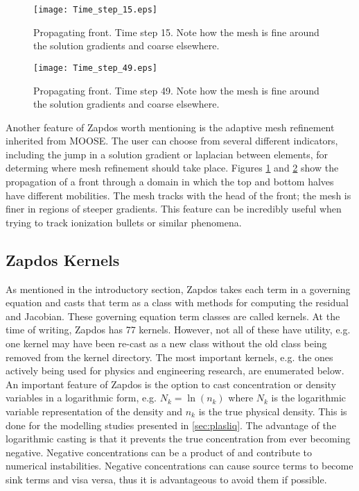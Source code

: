 \begin{figure}[htbp]
  \centering
  \texttt{[image: Time\_step\_15.eps]}
  \caption{Propagating front. Time step 15. Note how the mesh is fine around the solution gradients and coarse elsewhere.}
  \label{fig:step15}
\end{figure}

\begin{figure}[htbp]
  \centering
  \texttt{[image: Time\_step\_49.eps]}
  \caption{Propagating front. Time step 49. Note how the mesh is fine around the solution gradients and coarse elsewhere.}
  \label{fig:step49}
\end{figure}

Another feature of Zapdos worth mentioning is the adaptive mesh refinement inherited from MOOSE. The user can choose from several different indicators, including the jump in a solution gradient or laplacian between elements, for determing where mesh refinement should take place. Figures \ref{fig:step15} and \ref{fig:step49} show the propagation of a front through a domain in which the top and bottom halves have different mobilities. The mesh tracks with the head of the front; the mesh is finer in regions of steeper gradients. This feature can be incredibly useful when trying to track ionization bullets or similar phenomena.

\subsection{Zapdos Kernels}
\label{sec:zap_kernels}

As mentioned in the introductory section, Zapdos takes each term in a governing equation and casts that term as a class with methods for computing the residual and Jacobian. These governing equation term classes are called kernels. At the time of writing, Zapdos has 77 kernels. However, not all of these have utility, e.g. one kernel may have been re-cast as a new class without the old class being removed from the kernel directory. The most important kernels, e.g. the ones actively being used for physics and engineering research, are enumerated below. An important feature of Zapdos is the option to cast concentration or density variables in a logarithmic form, e.g. $N_k = \ln\left(n_k\right)$ where $N_k$ is the logarithmic variable representation of the density and $n_k$ is the true physical density. This is done for the modelling studies presented in \cref{sec:plasliq}. The advantage of the logarithmic casting is that it prevents the true concentration from ever becoming negative. Negative concentrations can be a product of and contribute to numerical instabilities. Negative concentrations can cause source terms to become sink terms and visa versa, thus it is advantageous to avoid them if possible.

